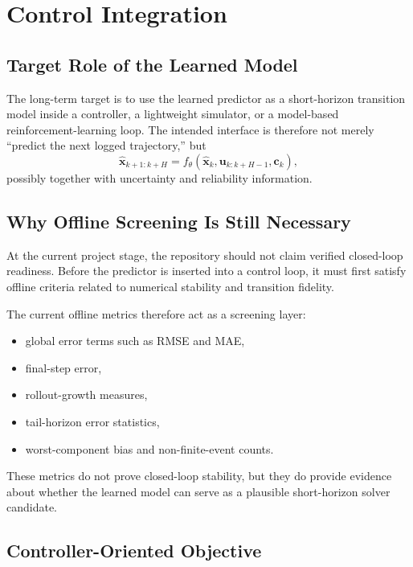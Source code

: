 \section{Control Integration}

\subsection{Target Role of the Learned Model}

The long-term target is to use the learned predictor as a short-horizon transition model inside a controller, a lightweight simulator, or a model-based reinforcement-learning loop.
The intended interface is therefore not merely ``predict the next logged trajectory,'' but
\begin{equation}
\hat{\mathbf{x}}_{k+1:k+H}
=
f_{\theta}\!\left(\hat{\mathbf{x}}_{k}, \mathbf{u}_{k:k+H-1}, \mathbf{c}_{k}\right),
\end{equation}
possibly together with uncertainty and reliability information.

\subsection{Why Offline Screening Is Still Necessary}

At the current project stage, the repository should not claim verified closed-loop readiness.
Before the predictor is inserted into a control loop, it must first satisfy offline criteria related to numerical stability and transition fidelity.

The current offline metrics therefore act as a screening layer:
\begin{itemize}
  \item global error terms such as RMSE and MAE,
  \item final-step error,
  \item rollout-growth measures,
  \item tail-horizon error statistics,
  \item worst-component bias and non-finite-event counts.
\end{itemize}

These metrics do not prove closed-loop stability, but they do provide evidence about whether the learned model can serve as a plausible short-horizon solver candidate.

\subsection{Controller-Oriented Objective}

